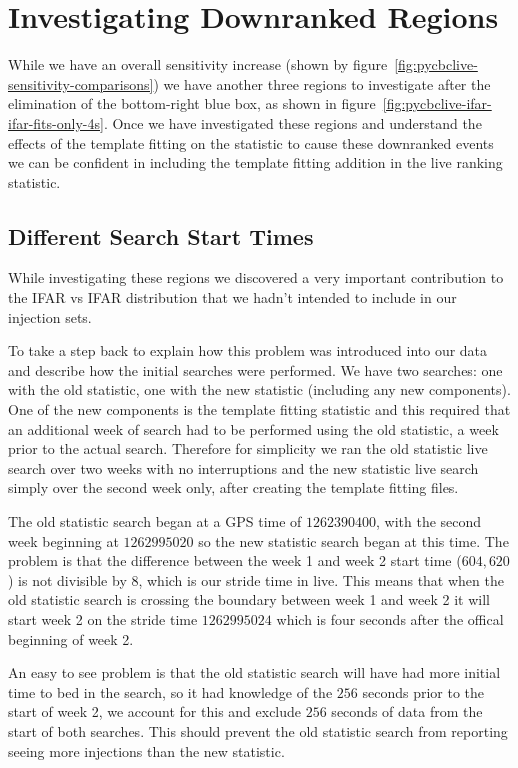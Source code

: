 \section{\label{pycbclive-investigating-regions}Investigating Downranked Regions}

While we have an overall sensitivity increase (shown by figure~\ref{fig:pycbclive-sensitivity-comparisons}) we have another three regions to investigate after the elimination of the bottom-right blue box, as shown in figure~\ref{fig:pycbclive-ifar-ifar-fits-only-4s}. Once we have investigated these regions and understand the effects of the template fitting on the statistic to cause these downranked events we can be confident in including the template fitting addition in the live ranking statistic.

\subsection{\label{sec:pycbclive-diff-start-times}Different Search Start Times}

While investigating these regions we discovered a very important contribution to the IFAR vs IFAR distribution that we hadn't intended to include in our injection sets. 

To take a step back to explain how this problem was introduced into our data and describe how the initial searches were performed. We have two searches: one with the old statistic, one with the new statistic (including any new components). One of the new components is the template fitting statistic and this required that an additional week of search had to be performed using the old statistic, a week prior to the actual search. Therefore for simplicity we ran the old statistic live search over two weeks with no interruptions and the new statistic live search simply over the second week only, after creating the template fitting files.

The old statistic search began at a GPS time of $1262390400$, with the second week beginning at $1262995020$ so the new statistic search began at this time. The problem is that the difference between the week 1 and week 2 start time ($604,620$) is not divisible by $8$, which is our stride time in live. This means that when the old statistic search is crossing the boundary between week 1 and week 2 it will start week 2 on the stride time $1262995024$ which is four seconds after the offical beginning of week 2.

An easy to see problem is that the old statistic search will have had more initial time to bed in the search, so it had knowledge of the $256$ seconds prior to the start of week 2, we account for this and exclude $256$ seconds of data from the start of both searches. This should prevent the old statistic search from reporting seeing more injections than the new statistic.

